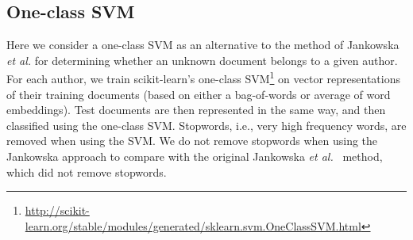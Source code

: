 \documentclass[11pt]{article}
\begin{document}
\subsection{One-class SVM}

Here we consider a one-class SVM as an alternative to the method of
Jankowska \textit{et al.} \cite{jankowska2014} for determining whether
an unknown document belongs to a given author.  For each author, we
train scikit-learn's one-class
SVM\footnote{\url{http://scikit-learn.org/stable/modules/generated/sklearn.svm.OneClassSVM.html}}
on vector representations of their training documents (based on either
a bag-of-words or average of word embeddings). Test documents are then
represented in the same way, and then classified using the one-class
SVM. Stopwords, i.e., very high frequency words, are removed when
using the SVM. We do not remove stopwords when using the Jankowska
approach to compare with the original Jankowska \textit{et
  al.}~\cite{jankowska2014} method, which did not remove stopwords.




\end{document}
